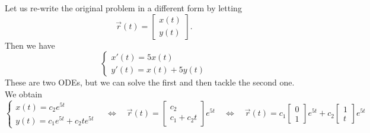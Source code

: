 \begin{example}
Let us re-write the original problem in a different form by letting 
$$
\vec{r}(t) = \begin{bmatrix} x(t) \\ y(t)\end{bmatrix}.
$$
Then we have
$$
\begin{cases}
x'(t) = 5 x(t) \\
y'(t) = x(t) +5 y(t)	
\end{cases}
$$
These are two ODEs, but we can solve the first and then tackle the second one.
We obtain
$$
\begin{cases}
	x(t) = c_2 e^{5t} \\
	y(t) = 	c_1 e^{5t} + c_2 t e^{5t} 
\end{cases}
\quad \Leftrightarrow \quad
	\vec{r}(t) = \begin{bmatrix}
		c_2 \\ c_1 + c_2 t
	\end{bmatrix} e^{5t}
\quad \Leftrightarrow \quad
	\vec{r}(t) = c_1 \begin{bmatrix} 0 \\ 1 \end{bmatrix} e^{5t} + c_2
	\begin{bmatrix}	1 \\ t
	\end{bmatrix} e^{5t}
$$
\end{example}

